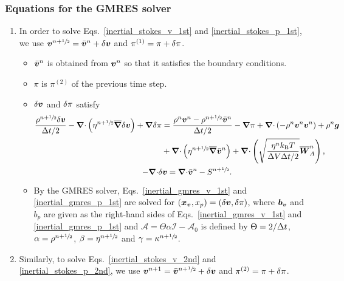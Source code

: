 \documentclass[
10pt
showpacs, showkeys,
amsmath,amssymb,
aps,
pre,
floatfix,
]{revtex4-1}
\newcommand{\divg}{{\V\nabla\cdot}}                       %
\newcommand{\paren}[1]{{(#1)}}                            %
\begin{document}
\begin{enumerate}
\end{enumerate}



\subsubsection{Equations for the GMRES solver}

\begin{enumerate}

\item In order to solve Eqs.~\eqref{inertial_stokes_v_1st} and \eqref{inertial_stokes_p_1st}, we use $\boldsymbol{v}^{n+\sfrac{1}{2}}=\bar{\boldsymbol{v}}^n+\delta\boldsymbol{v}$ and $\pi^\paren{1}=\pi+\d{\pi}$.

\begin{itemize}
\item $\bar{\boldsymbol{v}}^n$ is obtained from $\boldsymbol{v}^n$ so that it satisfies the boundary conditions.
\item $\pi$ is $\pi^\paren{2}$ of the previous time step.
\item $\delta\boldsymbol{v}$ and $\delta\pi$ satisfy
\begin{gather}
\label{inertial_gmres_v_1st}
\begin{split}
\frac{\rho^{n+\myhalf}\d{\V{v}}}{\D{t}/2} - \divg\left(\eta^{n+\myhalf}\overline{\grad}\d{\V{v}}\right) + \grad\d{\pi}
& = \frac{\rho^n\V{v}^n-\rho^{n+\myhalf}\bar{\V{v}}^n}{\D{t}/2} - \grad\pi 
+ \divg\left(-\rho^n\V{v}^n\V{v}^n\right) + \rho^n\V{g} \\
& + \divg\left( \eta^{n+\myhalf} \overline{\grad}\bar{\V{v}}^n \right)
+ \divg\left( \sqrt{\frac{\eta^n k_\mathrm{B}T}{\D{V}\D{t}/2} } \overline{\V{W}}^n_A \right),
\end{split} \\
\label{inertial_gmres_p_1st}
-\divg\d{\V{v}} = \divg\bar{\V{v}}^n-S^{n+\myhalf}.
\end{gather}
\item By the GMRES solver, Eqs.~\eqref{inertial_gmres_v_1st} and \eqref{inertial_gmres_p_1st} are solved for $(\boldsymbol{x}_{\boldsymbol{v}},x_p)=(\delta\boldsymbol{v},\delta\pi)$, where $\boldsymbol{b}_{\boldsymbol{v}}$ and $b_p$ are given as the right-hand sides of Eqs.~\eqref{inertial_gmres_v_1st} and \eqref{inertial_gmres_p_1st} and 
$\mathcal{A}=\Theta\alpha\mathcal{I}-\mathcal{A}_0$ is defined by $\Theta=2/\Delta t$, $\alpha=\rho^{n+\sfrac{1}{2}}$, $\beta=\eta^{n+\sfrac{1}{2}}$ and $\gamma=\kappa^{n+\sfrac{1}{2}}$.
\end{itemize}

\item Similarly, to solve Eqs.~\eqref{inertial_stokes_v_2nd} and \eqref{inertial_stokes_p_2nd}, we use $\boldsymbol{v}^{n+1}=\bar{\boldsymbol{v}}^{n+\sfrac{1}{2}}+\delta\boldsymbol{v}$ and $\pi^\paren{2}=\pi+\d{\pi}$.


\end{enumerate}
\end{document}
